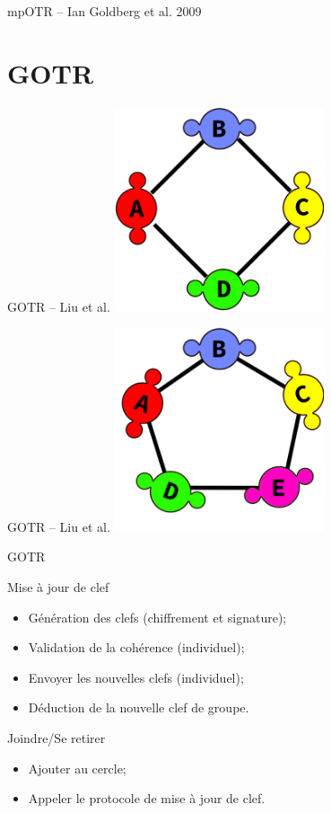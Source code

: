 \documentclass{beamer}
\begin{document}
\begin{frame}{mpOTR – Ian Goldberg et al. 2009~\cite{mpotr}}
\section{GOTR}
\begin{frame}{GOTR -- Liu et al.\cite{gotr}}
	\center
	\includegraphics[height=6cm]{img/group_ring4.png}
\end{frame}

\begin{frame}{GOTR -- Liu et al.\cite{gotr}}
	\center
	\includegraphics[height=6cm]{img/group_ring5.png}
\end{frame}

\begin{frame}{GOTR}

	\begin{block}{Mise à jour de clef}
		\begin{itemize}
      \item Génération des clefs (chiffrement et signature);
      \item Validation de la cohérence (individuel);
      \item Envoyer les nouvelles clefs (individuel);
			\item Déduction de la nouvelle clef de groupe.
		\end{itemize}
  \end{block}

	\begin{block}{Joindre/Se retirer}
		\begin{itemize}
			\item Ajouter au cercle;
			\item Appeler le protocole de mise à jour de clef.
		\end{itemize}
  \end{block}
\end{frame}


\end{frame}
\end{document}
